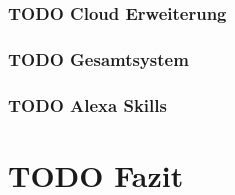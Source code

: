 
\subsubsection{\textbf{TODO} Cloud Erweiterung} %


\subsubsection{\textbf{TODO} Gesamtsystem} %


\subsubsection{\textbf{TODO} Alexa Skills} %



\section{\textbf{TODO} Fazit}


